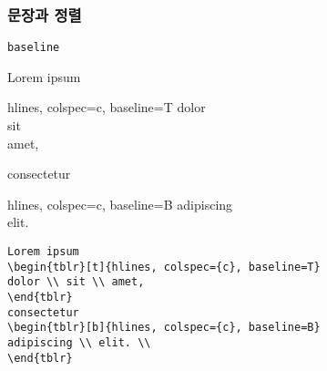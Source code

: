 \documentclass{beamer}
\newcommand*{\manual}[1]{\texttt{Tabularray}\footnote[2]{버전 2022A (2022-03-01)} 매뉴얼 \textbf{#1}}
\begin{document}
\begin{frame}
  \frametitle{문장과 정렬}
  \verb/baseline/


  \begin{center}
    Lorem ipsum
    \begin{tblr}[t]{hlines, colspec={c}, baseline=T}
    dolor \\ sit \\ amet,
    \end{tblr}
    consectetur
    \begin{tblr}[b]{hlines, colspec={c}, baseline=B}
    adipiscing \\ elit. \\
    \end{tblr}
  \end{center}

  \framebreak
  \begin{lstlisting}
Lorem ipsum
\begin{tblr}[t]{hlines, colspec={c}, baseline=T}
dolor \\ sit \\ amet,
\end{tblr}
consectetur
\begin{tblr}[b]{hlines, colspec={c}, baseline=B}
adipiscing \\ elit. \\
\end{tblr}
  \end{lstlisting}
\end{frame}
\end{document}

